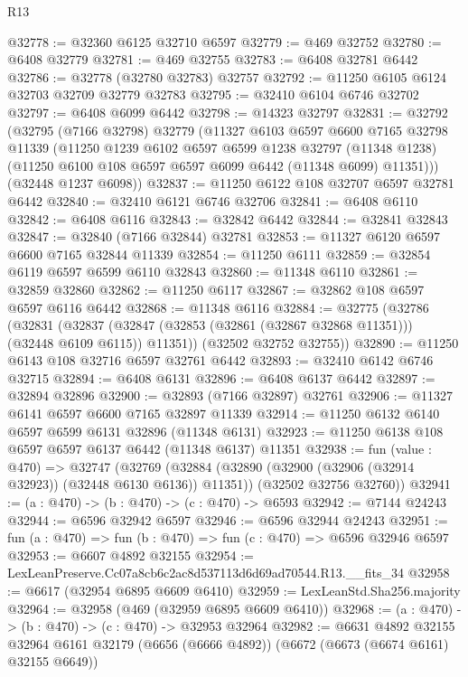 \begin{lexlean}{R13}
\begin{coremodule}
@32778 := @32360 @6125 @32710 @6597
@32779 := @469 @32752
@32780 := @6408 @32779
@32781 := @469 @32755
@32783 := @6408 @32781 @6442
@32786 := @32778 (@32780 @32783) @32757
@32792 := @11250 @6105 @6124 @32703 @32709 @32779 @32783
@32795 := @32410 @6104 @6746 @32702
@32797 := @6408 @6099 @6442
@32798 := @14323 @32797
@32831 := @32792
    (@32795
      (@7166 @32798)
      @32779
      (@11327
        @6103
        @6597
        @6600
        @7165
        @32798
        @11339
        (@11250
          @1239
          @6102
          @6597
          @6599
          @1238
          @32797
          (@11348 @1238)
          (@11250 @6100 @108 @6597 @6597 @6099 @6442 (@11348 @6099) @11351)))
      (@32448 @1237 @6098))
@32837 := @11250 @6122 @108 @32707 @6597 @32781 @6442
@32840 := @32410 @6121 @6746 @32706
@32841 := @6408 @6110
@32842 := @6408 @6116
@32843 := @32842 @6442
@32844 := @32841 @32843
@32847 := @32840 (@7166 @32844) @32781
@32853 := @11327 @6120 @6597 @6600 @7165 @32844 @11339
@32854 := @11250 @6111
@32859 := @32854 @6119 @6597 @6599 @6110 @32843
@32860 := @11348 @6110
@32861 := @32859 @32860
@32862 := @11250 @6117
@32867 := @32862 @108 @6597 @6597 @6116 @6442
@32868 := @11348 @6116
@32884 := @32775
    (@32786
      (@32831
        (@32837 (@32847 (@32853 (@32861 (@32867 @32868 @11351))) (@32448 @6109 @6115)) @11351))
      (@32502 @32752 @32755))
@32890 := @11250 @6143 @108 @32716 @6597 @32761 @6442
@32893 := @32410 @6142 @6746 @32715
@32894 := @6408 @6131
@32896 := @6408 @6137 @6442
@32897 := @32894 @32896
@32900 := @32893 (@7166 @32897) @32761
@32906 := @11327 @6141 @6597 @6600 @7165 @32897 @11339
@32914 := @11250 @6132 @6140 @6597 @6599 @6131 @32896 (@11348 @6131)
@32923 := @11250 @6138 @108 @6597 @6597 @6137 @6442 (@11348 @6137) @11351
@32938 := fun (value : @470) =>
  @32747
    (@32769
      (@32884 (@32890 (@32900 (@32906 (@32914 @32923)) (@32448 @6130 @6136)) @11351))
      (@32502 @32756 @32760))
@32941 := (a : @470) -> (b : @470) -> (c : @470) -> @6593
@32942 := @7144 @24243
@32944 := @6596 @32942 @6597
@32946 := @6596 @32944 @24243
@32951 := fun (a : @470) => fun (b : @470) => fun (c : @470) => @6596 @32946 @6597
@32953 := @6607 @4892 @32155
@32954 := LexLeanPreserve.Cc07a8cb6c2ac8d537113d6d69ad70544.R13.__fits_34
@32958 := @6617 (@32954 @6895 @6609 @6410)
@32959 := LexLeanStd.Sha256.majority
@32964 := @32958 (@469 (@32959 @6895 @6609 @6410))
@32968 := (a : @470) -> (b : @470) -> (c : @470) -> @32953 @32964
@32982 := @6631
    @4892
    @32155
    @32964
    @6161
    @32179
    (@6656 (@6666 @4892))
    (@6672 (@6673 (@6674 @6161) @32155 @6649))

\end{coremodule}
\end{lexlean}
